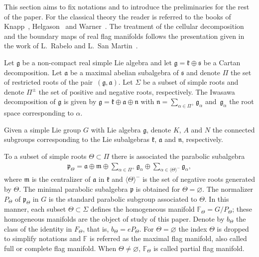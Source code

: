 \documentclass[pdftex]{sigma}
\numberwithin{equation}{section}
\begin{document}
This section aims to fix notations and to introduce the preliminaries for the rest of the paper. For the classical theory the reader is referred to the books of Knapp~\cite{knapp}, Helgason~\cite{He} and Warner~\cite{WarG}. The treatment of the cellular decomposition and the boundary maps of real flag manifolds follows the presentation given in the work of L.~Rabelo and L.~San Martin~\cite{RSM}.

Let $\mathfrak{g }$ be a non-compact real simple Lie algebra and let $\mathfrak{g }=\mathfrak{k }\oplus\mathfrak{s }$ be a Cartan decomposition. Let $\mathfrak{a }$ be a maximal abelian subalgebra of $\mathfrak{s }$ and denote $\Pi$ the set of restricted roots of the pair~$(\mathfrak{g },\mathfrak{a })$. Let $\Sigma$ be a subset of simple roots and denote $\Pi^{\pm}$ the set of positive and negative roots, respectively. The Iwasawa decomposition of $\mathfrak{g }$ is given by $\mathfrak{g }=\mathfrak{k }\oplus\mathfrak{a }\oplus\mathfrak{n }$ with $\mathfrak{n }=\sum\limits_{\alpha\in\Pi^+}\mathfrak{g }_\alpha$ and~$\mathfrak{g}_\alpha$ the
root space corresponding to $\alpha$.

Given a simple Lie group $G$ with Lie algebra $\mathfrak{g}$, denote $K$, $A$ and $N$ the connected subgroups corresponding to the Lie subalgebras $\mathfrak{k}$, $\mathfrak{a}$ and $\mathfrak{n}$, respectively.

To a subset of simple roots $\Theta \subset \Pi $ there is associated the parabolic subalgebra
\begin{gather*}
\mathfrak{p}_{\Theta }=\mathfrak{a}\oplus \mathfrak{m}\oplus \sum_{\alpha \in \Pi ^{+}}\mathfrak{g}_{\alpha }\oplus \sum_{\alpha \in \langle\Theta\rangle ^{-}}\mathfrak{g}_{\alpha },
\end{gather*}
where $\mathfrak{m}$ is the centralizer of $\mathfrak{a}$ in $\mathfrak{k}$ and $\langle\Theta\rangle ^{-}$ is the set of negative roots generated by $\Theta $. The minimal parabolic subalgebra $\mathfrak{p}$ is obtained for $\Theta =\varnothing $. The normalizer $P_{\Theta }$ of $\mathfrak{p}_{\Theta }$ in $G$ is the standard parabolic subgroup associated to $\Theta $. In this manner, each subset $\Theta \subset \Sigma $ defines the homogeneous manifold $\mathbb{F}_{\Theta }=G/P_{\Theta }$; these homogeneous manifolds are the object of study of this paper. Denote by $b_{\Theta }$ the class of the identity in $F_{\Theta }$, that is, $b_{\Theta }=eP_{\Theta }$. For $\Theta =\varnothing $ the index $\Theta $ is dropped to simplify notations and $\mathbb{F}$ is referred as the maximal flag manifold, also called full or complete flag manifold. When $\Theta \neq \varnothing $, $\mathbb{F}_{\Theta }$ is called partial flag manifold.
\end{document}
